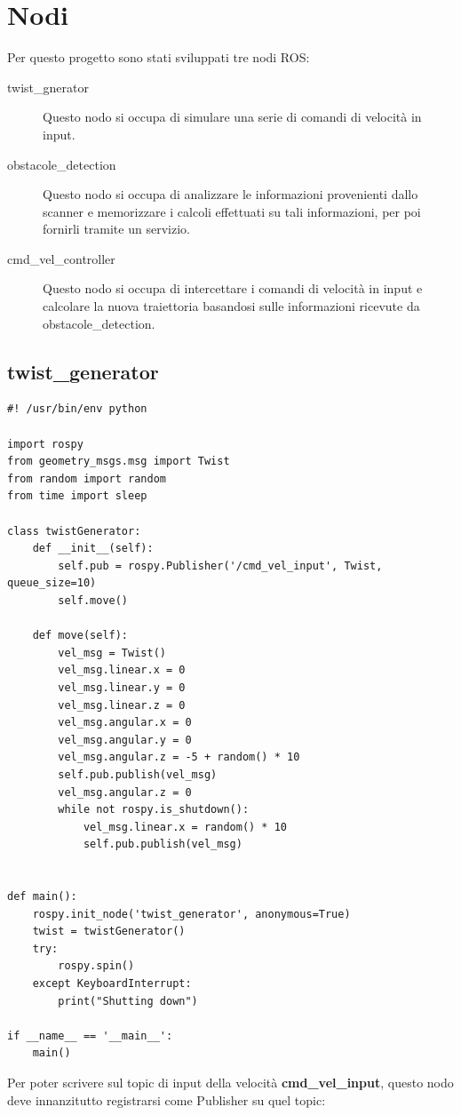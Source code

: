 \documentclass[Lau, binding=0.6cm, oneside]{sapthesis}
\begin{document}
\section{Nodi}
Per questo progetto sono stati sviluppati tre nodi ROS:
\begin{description}
	\item[twist\_gnerator] Questo nodo si occupa di simulare una serie di comandi di velocità in input.
	\item[obstacole\_detection] Questo nodo si occupa di analizzare le informazioni provenienti dallo scanner e memorizzare i calcoli effettuati su tali informazioni, per poi fornirli tramite un servizio.
	\item[cmd\_vel\_controller] Questo nodo si occupa di intercettare i comandi di velocità in input e calcolare la nuova traiettoria basandosi sulle informazioni ricevute da obstacole\_detection.
\end{description}

\subsection{twist\_generator}
\begin{lstlisting}
#! /usr/bin/env python

import rospy
from geometry_msgs.msg import Twist
from random import random
from time import sleep

class twistGenerator:
    def __init__(self):
        self.pub = rospy.Publisher('/cmd_vel_input', Twist, queue_size=10)
        self.move()
    
    def move(self):
        vel_msg = Twist()
        vel_msg.linear.x = 0
        vel_msg.linear.y = 0
        vel_msg.linear.z = 0
        vel_msg.angular.x = 0
        vel_msg.angular.y = 0
        vel_msg.angular.z = -5 + random() * 10
        self.pub.publish(vel_msg)
        vel_msg.angular.z = 0
        while not rospy.is_shutdown():
            vel_msg.linear.x = random() * 10
            self.pub.publish(vel_msg)


def main():
    rospy.init_node('twist_generator', anonymous=True)
    twist = twistGenerator()
    try:
        rospy.spin()
    except KeyboardInterrupt:
        print("Shutting down")

if __name__ == '__main__':
    main()
\end{lstlisting}

Per poter scrivere sul topic di input della velocità \textbf{cmd\_vel\_input}, questo nodo deve innanzitutto registrarsi come Publisher su quel topic:
\end{document}
